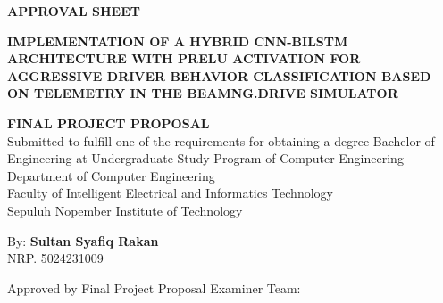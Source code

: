 \begin{center}
	\large
  \textbf{APPROVAL SHEET}
\end{center}

\thispagestyle{empty}

\begin{center}
  \textbf{IMPLEMENTATION OF A HYBRID CNN-BILSTM ARCHITECTURE WITH PRELU ACTIVATION FOR AGGRESSIVE DRIVER BEHAVIOR CLASSIFICATION BASED ON TELEMETRY IN THE BEAMNG.DRIVE SIMULATOR}
\end{center}

\begingroup
  \small

  \begin{center}
    \textbf{FINAL PROJECT PROPOSAL} \\
    Submitted to fulfill one of the requirements for obtaining a degree
    Bachelor of Engineering at 
    Undergraduate Study Program of Computer Engineering \\
    Department of Computer Engineering \\
    Faculty of Intelligent Electrical and Informatics Technology \\
    Sepuluh Nopember Institute of Technology
  \end{center}

  \begin{center}
    By: \textbf{Sultan Syafiq Rakan} \\
    NRP. 5024231009
  \end{center}

  \begin{center}
    Approved by Final Project Proposal Examiner Team:
  \end{center}

  \begingroup
    \setlength{\tabcolsep}{0pt}

